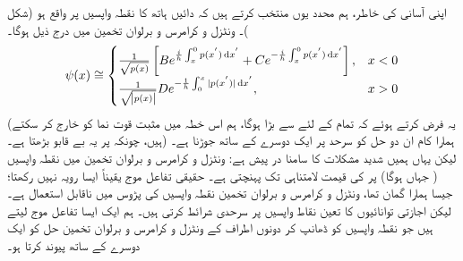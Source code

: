 اپنی آسانی کی خاطر، ہم محدد یوں منتخب کرتے ہیں کہ دائیں ہاتھ کا نقطہ واپسیں  پر واقع ہو (شکل )۔ ونٹزل و کرامرس و برلوان تخمین میں درج ذیل ہوگا۔
\begin{align}\label{مساوات_وقب_تخمین}
	\psi (x) \cong
	\begin{cases}
		\frac{1}{\sqrt{p(x)}}\left[B e^{\frac{i}{h} \int^{0}_{x} p(x^{'}) \dif x^{'}} + C e^{- \frac{i}{h} \int^{0}_{x} p(x^{'}) \dif x^{'}}\right] ,& x < 0 \\
		\frac{1}{\sqrt{\abs{p(x)}}} D e^{- \frac{1}{h} \int^{x}_{0}|p(x^{'})| \dif x^{'}},& x> 0 
	\end{cases}
\end{align}
(یہ فرض کرتے ہوئے کہ تمام  کے لئے  سے  بڑا ہوگا، ہم اس خطہ میں مثبت قوت نما کو خارج کر سکتے ہیں، چونکہ  پر یہ بے قابو بڑھتا ہے۔) ہمارا کام ان دو حل کو سرحد پر ایک دوسرے کے ساتھ جوڑنا ہے۔ لیکن یہاں ہمیں شدید مشکلات کا سامنا در پیش ہے: ونٹزل و کرامرس و برلوان تخمین میں نقطہ واپسیں ( جہاں  ہوگا) پر  کی قیمت لامتناہی تک پہنچتی ہے۔ حقیقی تفاعل موج یقیناً ایسا رویہ نہیں رکھتا؛ جیسا ہمارا گمان تھا، ونٹزل و کرامرس و برلوان تخمین نقطہ واپسیں کی پڑوس میں ناقابل استعمال ہے۔ لیکن اجازتی توانائیوں کا تعین نقاط واپسیں پر سرحدی شرائط کرتی ہیں۔ ہم ایک ایسا  تفاعل موج لیتے ہیں جو نقطہ واپسیں کو ڈھانپ کر دونوں اطراف کے ونٹزل و کرامرس و برلوان تخمین حل کو ایک دوسرے کے ساتھ پیوند کرتا ہو۔

